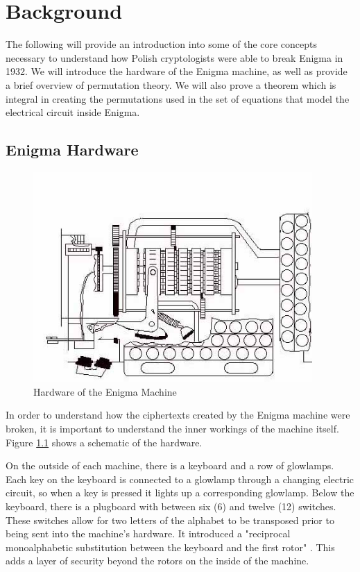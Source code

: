 \chapter{Background}\label{chap:background}

The following will provide an introduction into some of the core concepts necessary to understand how Polish cryptologists were able to break Enigma in 1932. We will introduce the hardware of the Enigma machine, as well as provide a brief overview of permutation theory. We will also prove a theorem which is integral in creating the permutations used in the set of equations that model the electrical circuit inside Enigma.

\section{Enigma Hardware}

\begin{figure}[h!]
\begin{centering}
  \includegraphics[height=8cm]{images/rotors.jpg}
  \caption{Hardware of the Enigma Machine}
  \label{fig:hardware1}
\end{centering}
\end{figure}

In order to understand how the ciphertexts created by the Enigma machine were broken, it is important to understand the inner workings of the machine itself. Figure \ref{fig:hardware1} shows a schematic of the hardware.

On the outside of each machine, there is a keyboard and a row of glowlamps. Each key on the keyboard is connected to a glowlamp through a changing electric circuit, so when a key is pressed it lights up a corresponding glowlamp. Below the keyboard, there is a plugboard with between six (6) and twelve (12) switches. These switches allow for two letters of the alphabet to be transposed prior to being sent into the machine's hardware. It introduced a "reciprocal monoalphabetic substitution between the keyboard and the first rotor" \cite{bw05}. This adds a layer of security beyond the rotors on the inside of the machine.

